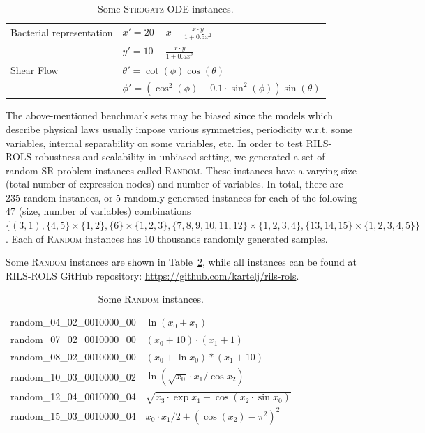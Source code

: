 \documentclass{bmcart}
\begin{document}
\begin{itemize}
	
	\begin{table}
		\centering
		\begin{tabular}{ll} \\ \hline
			Bacterial representation &   $x' = 20 - x - \frac{x \cdot y}{1 + 0.5 x^2 }$ \\ 
			&   $y' = 10 - \frac{x \cdot y}{1 + 0.5 x^2  }$ \\ \hline
			Shear Flow               &  $\theta' = \cot(\phi)\cos(\theta)$ \\
			&  $ \phi'  = ( \cos^2(\phi) + 0.1 \cdot \sin^2 (\phi)) \sin(\theta) $ \\ \hline
		\end{tabular}
		\caption{Some \textsc{Strogatz} ODE instances.}
		\label{table:strogatz-ODEs}
	\end{table}
	
\end{itemize}

The above-mentioned benchmark sets may be biased since the models which describe physical laws usually impose   various symmetries, periodicity w.r.t. some variables, internal separability on some variables, etc. In order to test \textsc{RILS-ROLS} robustness and scalability in unbiased setting, we generated a set of random SR problem instances called \textsc{Random}. These instances have a varying size (total number of expression nodes) and number of variables. In total, there are 235 random instances, or 5 randomly generated instances for each of the following 47 (size, number of variables) combinations $\{(3, 1), \{4, 5\} \times \{1, 2\}, \{6\} \times \{1, 2, 3\}, \{7, 8, 9, 10, 11, 12\} \times \{1, 2, 3, 4\}, \{13, 14, 15\} \times \{1, 2, 3, 4, 5\}\}$. Each of \textsc{Random} instances has 10 thousands randomly generated samples. 

Some \textsc{Random} instances are shown in Table~\ref{table:random}, while all instances can be found at \textsc{RILS-ROLS} GitHub repository: \url{https://github.com/kartelj/rils-rols}. 

\begin{table}
	\centering
	\begin{tabular}{ll} \\ \hline
		random\_04\_02\_0010000\_00 &	$\ln{(x_0 + x_1)}$\\
		random\_07\_02\_0010000\_00 &	$(x_0 + 10)\cdot (x_1 + 1)$\\
		random\_08\_02\_0010000\_00 &	$(x_0 + \ln{x_0})*(x_1 + 10)$\\
		random\_10\_03\_0010000\_02 &	$\ln{(\sqrt{x_0} \cdot x_1/\cos{x_2})}$\\
		random\_12\_04\_0010000\_04 &	$\sqrt{x_3 \cdot \exp{x_1} + \cos{(x_2 \cdot \sin{x_0})}}$\\
		random\_15\_03\_0010000\_04	&   $x_0 \cdot x_1/2 + (\cos{(x_2)} - \pi^2)^2$\\
		\hline
	\end{tabular}
	\caption{Some \textsc{Random} instances.}
	\label{table:random}
\end{table}
\end{document}

